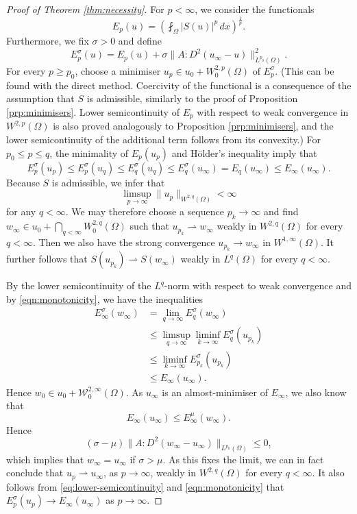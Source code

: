 \documentclass[a4paper]{article}
\newcommand{\W}{\mathcal{W}}
\theoremstyle{remark}
\begin{document}
\begin{proof}[Proof of Theorem \ref{thm:necessity}]
For $p < \infty$, we consider the functionals
\[
E_p(u) = \left(\fint_\Omega |S(u)|^p \, dx\right)^{\frac{1}{p}}.
\]
Furthermore, we fix $\sigma > 0$ and define
\[
E_p^\sigma(u) = E_p(u) + \sigma \|A : D^2(u_\infty - u)\|_{L^{p_0}(\Omega)}^2.
\]
For every $p \ge p_0$, choose a minimiser $u_p \in u_0 + W_0^{2, p}(\Omega)$ of $E_p^\sigma$.
(This can be found with the direct method. Coercivity of the functional is
a consequence of the assumption that $S$ is admissible, similarly to the proof of Proposition \ref{prp:minimisers}.
Lower semicontinuity of $E_p$ with respect to weak convergence in $W^{2, p}(\Omega)$ is also proved
analogously to Proposition \ref{prp:minimisers}, and the lower semicontinuity of the additional term
follows from its convexity.)
For $p_0 \le p \le q$, the minimality of $E_p(u_p)$ and H\"older's inequality
imply that
\begin{equation} \label{eqn:monotonicity}
E_p^\sigma(u_p) \le E_p^\sigma(u_q) \le E_q^\sigma(u_q) \le E_q^\sigma(u_\infty) = E_q(u_\infty) \le E_\infty(u_\infty).
\end{equation}
Because $S$ is admissible, we infer that
\begin{equation} \label{eqn:u_p-estimate}
\limsup_{p \to \infty} \|u_p\|_{W^{2, q}(\Omega)} < \infty
\end{equation}
for any $q < \infty$. We may therefore choose a sequence $p_k \to \infty$
and find $w_\infty \in u_0 + \bigcap_{q < \infty} W_0^{2, q}(\Omega)$ such
that $u_{p_k} \rightharpoonup w_\infty$
weakly in $W^{2, q}(\Omega)$ for every $q < \infty$. Then we also have the
strong convergence $u_{p_k} \to w_\infty$ in $W^{1, \infty}(\Omega)$.
It further follows that $S(u_{p_k}) \rightharpoonup S(w_\infty)$
weakly in $L^q(\Omega)$ for every $q < \infty$.

By the lower semicontinuity of the $L^q$-norm with respect to weak convergence and
by \eqref{eqn:monotonicity}, we have the inequalities
\begin{equation} \label{eq:lower-semicontinuity}
\begin{split}
E_\infty^\sigma(w_\infty) & = \lim_{q \to \infty} E_q^\sigma(w_\infty) \\
& \le \limsup_{q \to \infty} \liminf_{k \to \infty} E_q^\sigma(u_{p_k}) \\
& \le \liminf_{k \to \infty} E_{p_k}^\sigma(u_{p_k}) \\
& \le E_\infty(u_\infty).
\end{split}
\end{equation}
Hence $w_0 \in u_0 + \W_0^{2, \infty}(\Omega)$. As $u_\infty$ is an almost-minimiser of $E_\infty$, we also know that
\[
E_\infty(u_\infty) \le E_\infty^\mu(w_\infty).
\]
Hence
\[
(\sigma - \mu) \|A : D^2(w_\infty - u_\infty)\|_{L^{p_0}(\Omega)} \le 0,
\]
which implies that $w_\infty = u_\infty$ if $\sigma > \mu$. As this fixes the limit, we can in fact conclude that
$u_p \rightharpoonup u_\infty$, as $p \to \infty$, weakly in $W^{2, q}(\Omega)$ for every $q < \infty$.
It also follows from \eqref{eq:lower-semicontinuity} and \eqref{eqn:monotonicity} that $E_p^\sigma(u_p) \to E_\infty(u_\infty)$ as $p \to \infty$.


\end{proof}
\end{document}
